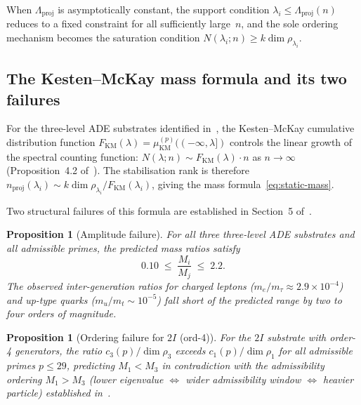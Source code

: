 \documentclass[11pt,a4paper]{article}
\newtheorem{proposition}[theorem]{Proposition}
\newcommand{\Lproj}{\Lambda_{\mathrm{proj}}}
\newcommand{\FKM}{F_{\mathrm{KM}}}
\newcommand{\Mi}{M_i}
\newcommand{\Mj}{M_j}
\begin{document}
      When $\Lproj$ is asymptotically constant, the support condition
      $\lambda_{i}\leq\Lproj(n)$ reduces to a fixed constraint for all sufficiently
      large~$n$, and the sole ordering mechanism becomes the saturation condition
      $N(\lambda_{i};n)\geq k\dim\rho_{\lambda_{i}}$.

    \subsection{The Kesten--McKay mass formula and its two failures}
      \label{subsec:km-failures}

      For the three-level ADE substrates identified in~\cite{Beau2026a4},
      the Kesten--McKay cumulative distribution function
      $\FKM(\lambda) = \mu^{(p)}_{\mathrm{KM}}((-\infty,\lambda])$
      controls the linear growth of the spectral counting function:
      $N(\lambda;n)\sim \FKM(\lambda)\cdot n$ as $n\to\infty$
      (Proposition~4.2 of~\cite{Beau2026a5}).
      The stabilisation rank is therefore
      $n_{\mathrm{proj}}(\lambda_{i})\sim k\dim\rho_{\lambda_{i}}/\FKM(\lambda_{i})$,
      giving the mass formula~\eqref{eq:static-mass}.

      Two structural failures of this formula are established
      in Section~5 of~\cite{Beau2026a5}.

      \begin{proposition}[Amplitude failure]
        \label{prop:amplitude}
        For all three three-level ADE substrates and all admissible primes,
        the predicted mass ratios satisfy
        \begin{equation}
          0.10 \;\leq\; \frac{\Mi}{\Mj} \;\leq\; 2.2.
        \end{equation}
        The observed inter-generation ratios for charged leptons
        ($m_{e}/m_{\tau}\approx 2.9\times10^{-4}$)
        and up-type quarks ($m_{u}/m_{t}\sim10^{-5}$)
        fall short of the predicted range by two to four orders of magnitude.
      \end{proposition}

      \begin{proposition}[Ordering failure for $2I$ (ord-4)]
        \label{prop:ordering}
        For the $2I$ substrate with order-4 generators,
        the ratio $c_{3}(p)/\dim\rho_{3}$ exceeds $c_{1}(p)/\dim\rho_{1}$
        for all admissible primes $p\leq 29$,
        predicting $M_{1}<M_{3}$ in contradiction with
        the admissibility ordering $M_{1}>M_{3}$
        (lower eigenvalue $\Leftrightarrow$ wider admissibility window
        $\Leftrightarrow$ heavier particle) established in~\cite{Beau2026a4}.
      \end{proposition}
\end{document}
